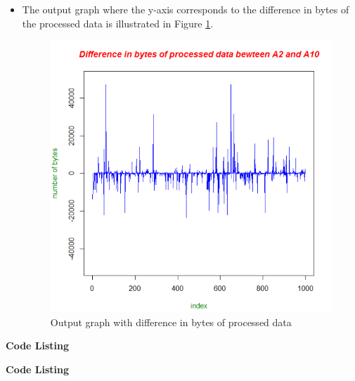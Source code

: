 \begin{itemize}
\begin{figure}[h!]
\end{figure}
\item The output graph where the y-axis corresponds to the difference in bytes of the processed data is illustrated in Figure \ref{fig:q4fig2}. 
\begin{figure}[h!]
\begin{center}
\hspace*{-3cm} 
\includegraphics[scale=0.55, keepaspectratio=true]{figures/q4p.PNG}
\caption{Output graph with difference in bytes of processed data}
\label{fig:q4fig2}
\end{center}
\end{figure}
\end{itemize}

\newpage
\textbf{Code Listing}
\sloppy



\textbf{Code Listing}
\sloppy



